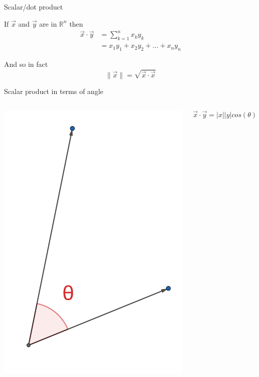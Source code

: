 \documentclass{beamer}
\begin{document}
\begin{frame}{Scalar/dot product}
  \begin{definition}
    If $\vec{x}$ and $\vec{y}$ are in $\mathbb R^n$ then
    \begin{align*}
      \vec{x}\cdot\vec{y} &= \sum_{k=1}^n x_ky_k\\
                          &= x_1y_1+x_2y_2+\dots +x_ny_n
    \end{align*}
  \end{definition}\vfill
  And so in fact
  \begin{equation*}
    \|\vec{x}\| = \sqrt{\vec{x}\cdot\vec{x}}
  \end{equation*}
\end{frame}

\begin{frame}{Scalar product in terms of angle}
  \begin{columns}
    \includegraphics[scale=2]{angle.png}
    \begin{definition}
      \begin{equation*}
        \vec{x}\cdot\vec{y} = |x||y|cos(\theta)
      \end{equation*}
    \end{definition}
  \end{columns}
\end{frame}
\end{document}
